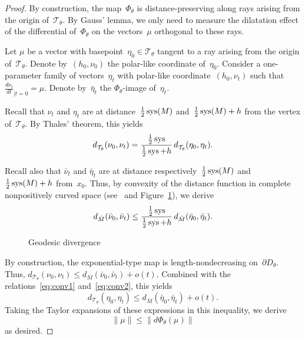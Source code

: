 \documentclass[12pt,reqno]{amsart}
\theoremstyle{definition}
\numberwithin{equation}{section}
\DeclareMathOperator{\sys}{{\rm sys}}
\numberwithin{equation}{section}
\begin{document}
\begin{proof}
By construction, the map~$\Phi_\theta$ is distance-preserving along rays arising from the origin of~$\mathcal{T}_\theta$.
By Gauss' lemma, we only need to measure the dilatation effect of the differential of~$\Phi_\theta$ on the vectors~$\mu$ orthogonal to these rays.

Let $\mu$ be a vector with basepoint~$\eta_0 \in \mathcal{T}_\theta$ tangent to a ray arising from the origin of~$\mathcal{T}_\theta$.
Denote by~$(h_0,\nu_0)$ the polar-like coordinate of~$\eta_0$.
Consider a one-parameter family of vectors~$\eta_t$ with polar-like coordinate~$(h_0,\nu_t)$ such that $\frac{d\nu_t}{dt}_{|t=0}=\mu$.
Denote by~$\bar{\eta}_t$ the $\Phi_\theta$-image of~$\eta_t$.

Recall that $\nu_t$ and $\eta_t$ are at distance~$\frac{1}{2} \sys(M)$ and~$\frac{1}{2} \sys(M)+h$ from the vertex of~$\mathcal{T}_\theta$. 
By Thales' theorem, this yields
\begin{equation} \label{eq:conv1}
d_{\mathcal{T}_\theta}^{\phantom{I}}(\nu_0, \nu_t) = \frac{\tfrac{1}{2}
  \sys}{\tfrac{1}{2} \sys + h} \, d_{\mathcal{T}_\theta}^{\phantom{I}}(\eta_0,
\eta_t).
\end{equation}

Recall also that $\bar{\nu}_t$ and $\bar{\eta}_t$ are at distance respectively~$\frac{1}{2} \sys(M)$ and~$\frac{1}{2} \sys(M)+h$ from~$x_0$.
Thus, by convexity of the distance function in complete nonpositively curved space (see~\cite[\S II.2.2]{BH} and Figure~\ref{fig:div}),
we derive
\begin{equation} \label{eq:conv2}
d_{\bar{M}}(\bar{\nu}_0, \bar{\nu}_t) \leq \frac{\tfrac{1}{2} \sys } {\tfrac{1}{2} \sys + h}\, d_{\bar{M}}(\bar{\eta}_0, \bar{\eta}_t).
\end{equation}



\begin{figure}[htbp!] 
\vspace{2.2cm}
\def\svgwidth{3.5cm}
 
\vspace{0.3cm}
\caption{Geodesic divergence} \label{fig:div}
\end{figure}



By construction, the exponential-type map is length-nondecreasing on~$\partial D_\theta$.
Thus, $d_{\mathcal{T}_\theta}(\nu_0, \nu_t) \leq d_{\bar{M}}(\bar{\nu}_0, \bar{\nu}_t)+o(t)$.
Combined with the relations~\eqref{eq:conv1} and~\eqref{eq:conv2}, this yields
\[
d_{\mathcal{T}_\theta}(\eta_0, \eta_t) \leq d_{\bar{M}}(\bar{\eta}_0, \bar{\eta}_t) + o(t).
\]
Taking the Taylor expansions of these expressions in this inequality, we derive
\[
\lVert \mu \rVert \leq \lVert d\Phi_\theta(\mu) \rVert
\]
as desired.
\end{proof}
\end{document}
